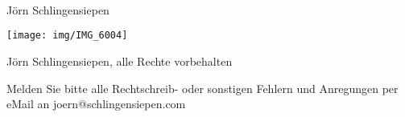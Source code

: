 \thispagestyle{empty}

\onecolumn

\vfill\null

{\Huge
\noindent \coursetitlefirst \\
\\
\noindent \coursetitlesecond \\
}

\vspace{.3cm}

{\Large
\noindent Jörn Schlingensiepen
}

\vspace{4cm}

\vfill\null

\begin{center}
	\texttt{[image: img/IMG\_6004]}
\end{center}

\vspace{.7cm}

\newpage

\vspace*{\fill}

\noindent\textcopyright Jörn Schlingensiepen, alle Rechte vorbehalten \\

\vspace{.7cm}

\noindent Melden Sie bitte alle Rechtschreib- oder sonstigen Fehlern und Anregungen 
per eMail an joern@schlingensiepen.com

